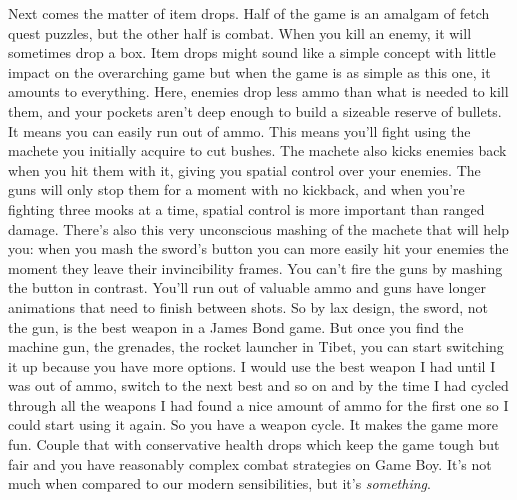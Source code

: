 \documentclass{book}
\let\oldcenter\center
\let\oldendcenter\endcenter
\renewenvironment{center}{\setlength\topsep{0pt}\oldcenter}{\oldendcenter}
\begin{document}
\begin{center}
\quad\vspace{4pt}
\quad\vspace{4pt}
\end{center}

Next comes the matter of item drops. Half of the game is an amalgam of fetch quest puzzles, but the other half is combat. When you kill an enemy, it will sometimes drop a box. Item drops might sound like a simple concept with little impact on the overarching game but when the game is as simple as this one, it amounts to everything. Here, enemies drop less ammo than what is needed to kill them, and your pockets aren’t deep enough to build a sizeable reserve of bullets. It means you can easily run out of ammo. This means you’ll fight using the machete you initially acquire to cut bushes. The machete also kicks enemies back when you hit them with it, giving you spatial control over your enemies. The guns will only stop them for a moment with no kickback, and when you’re fighting three mooks at a time, spatial control is more important than ranged damage. There’s also this very unconscious mashing of the machete that will help you: when you mash the sword’s button you can more easily hit your enemies the moment they leave their invincibility frames. You can’t fire the guns by mashing the button in contrast. You’ll run out of valuable ammo and guns have longer animations that need to finish between shots. So by lax design, the sword, not the gun, is the best weapon in a James Bond game. But once you find the machine gun, the grenades, the rocket launcher in Tibet, you can start switching it up because you have more options. I would use the best weapon I had until I was out of ammo, switch to the next best and so on and by the time I had cycled through all the weapons I had found a nice amount of ammo for the first one so I could start using it again. So you have a weapon cycle. It makes the game more fun. Couple that with conservative health drops which keep the game tough but fair and you have reasonably complex combat strategies on Game Boy. It’s not much when compared to our modern sensibilities, but it’s \emph{something}.
\end{document}
